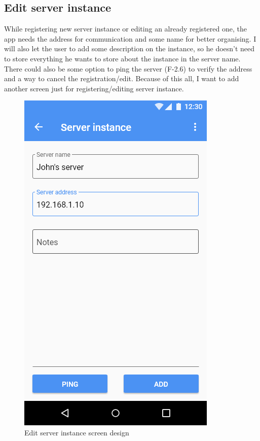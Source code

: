 \subsection{Edit server instance}
While registering new server instance or editing an already registered one, the app needs the address for communication and some name for better organising.
I will also let the user to add some description on the instance, so he doesn't need to store everything he wants to store about the instance in the server name.
There could also be some option to ping the server (F-2.6) to verify the address and a way to cancel the registration/edit.
Because of this all, I want to add another screen just for registering/editing server instance.

\begin{figure}\centering
    \begin{minipage}[b]{0.32\textwidth}
    	\includegraphics[width=\textwidth]{pics/xd/Edit server instance.png}
    	\caption[Edit server instance]{Edit server instance screen design}\label{fig:xdEditServerInstance}
    \end{minipage}
\end{figure}


